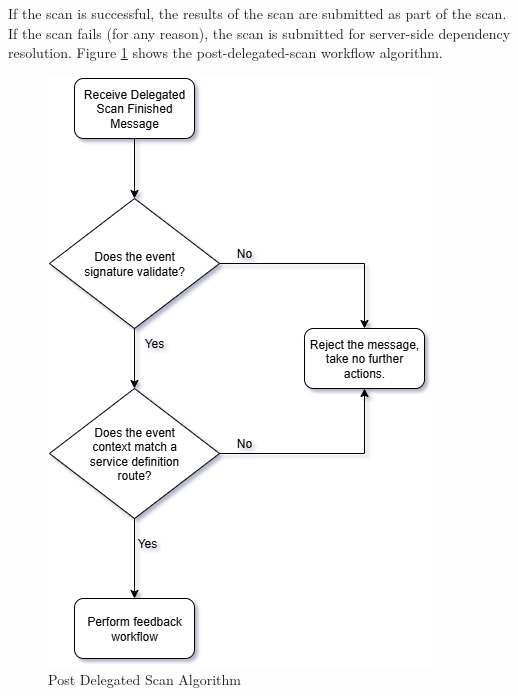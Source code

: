 If the \scaresolver scan is successful, the results of the 
scan are submitted as part of the \cxone scan.  If the \scaresolver scan fails (for any reason), the \cxone scan is submitted for server-side dependency resolution.
Figure \ref{fig:post-delegated-scan-flowchart} shows the post-delegated-scan workflow algorithm.

\begin{figure}[ht]
  \includegraphics[scale=.8]{graphics/cxoneflow-diagrams-Post Delegated Scan Algorithm.png}
  \centering
  \caption{Post Delegated Scan Algorithm}
  \label{fig:post-delegated-scan-flowchart}
\end{figure}



